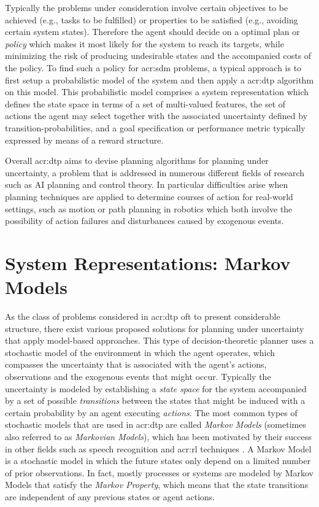 Typically the problems under consideration involve certain objectives to be achieved (e.g., tasks to be fulfilled) or properties to be satisfied (e.g., avoiding certain system states). 
Therefore the agent should decide on a optimal plan or \textit{policy} which makes it most likely for the system to reach its targets, while minimizing the risk of producing undesirable states and the accompanied costs of the policy.
To find such a policy for \acrlong{acr:sdm} problems, a typical approach is to first setup a probabilistic model of the system and then apply a \acrshort{acr:dtp} algorithm on this model.
This probabilistic model comprises a system representation which defines the state space in terms of a set of multi-valued features, the set of actions the agent may select together with the associated uncertainty defined by transition-probabilities, and a goal specification or performance metric typically expressed by means of a reward structure.

Overall \acrshort{acr:dtp} aims to devise planning algorithms for planning under uncertainty, a problem that is addressed in numerous different fields of research such as AI planning and control theory.
In particular difficulties arise when planning techniques are applied to determine courses of action for real-world settings, such as motion or path planning in robotics which both involve the possibility of action failures and disturbances caused by exogenous events.

\section{System Representations: Markov Models}
\label{sec:system-representation}

As the class of problems considered in \acrshort{acr:dtp} oft to present considerable structure, there exist various proposed solutions for planning under uncertainty that apply model-based approaches.
This type of decision-theoretic planner uses a stochastic model of the environment in which the agent operates, which compasses the uncertainty that is associated with the agent's actions, observations and the exogenous events that might occur.
Typically the uncertainty is modeled by establishing a \textit{state space} for the system accompanied by a set of possible \textit{transitions} between the states that might be induced with a certain probability by an agent executing \textit{actions}.
The most common types of stochastic models that are used in \acrshort{acr:dtp} are called \textit{Markov Models} (sometimes also referred to as \textit{Markovian Models}), which has been motivated by their success in other fields such as speech recognition \cite{baker1992large, gales2008application, rabiner1989tutorial} and \acrfull{acr:rl} techniques \cite{Brafman2002}.
A Markov Model is a stochastic model in which the future states only depend on a limited number of prior observations. In fact, mostly processes or systems are modeled by Markov Models that satisfy the \textit{Markov Property}, which means that the state transitions are independent of any previous states or agent actions.

